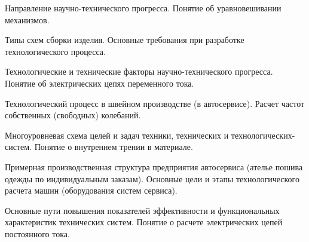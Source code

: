 \documentclass[
	14pt,
	a4paper,
	]
	{scrartcl}
\begin{document}
\shapk
{}
\setcounter{zad}{0}

\vfill
\z Направление научно-технического прогресса.
 \vfill
\z Понятие об уравновешивании механизмов. \vfill

\vfill

\newpage


\shapk
{}
\setcounter{zad}{0}

\vfill
\z Типы схем сборки изделия.
 \vfill
\z Основные требования при разработке технологического процесса.
 \vfill

\vfill

\newpage


\shapk
{}
\setcounter{zad}{0}

\vfill
\z Технологические и технические факторы научно-технического прогресса.
 \vfill
\z Понятие об электрических цепях переменного тока.
 \vfill

\vfill

\newpage


\shapk
{}
\setcounter{zad}{0}

\vfill
\z Технологический процесс в швейном производстве (в автосервисе).
 \vfill
\z Расчет частот собственных (свободных) колебаний.
 \vfill

\vfill

\newpage


\shapk
{}
\setcounter{zad}{0}

\vfill
\z Многоуровневая схема целей и задач техники, технических и технологических- систем.
 \vfill
\z Понятие о внутреннем трении в материале.
 \vfill

\vfill

\newpage


\shapk
{}
\setcounter{zad}{0}

\vfill
\z Примерная производственная структура предприятия автосервиса (ателье пошива одежды по индивидуальным заказам).
 \vfill
\z Основные цели и этапы технологического расчета машин (оборудования систем сервиса).
 \vfill

\vfill

\newpage


\shapk
{}
\setcounter{zad}{0}

\vfill
\z Основные пути повышения показателей эффективности и функциональных характеристик технических систем.
 \vfill
\z Понятие о расчете электрических цепей постоянного тока.
 \vfill
\end{document}
